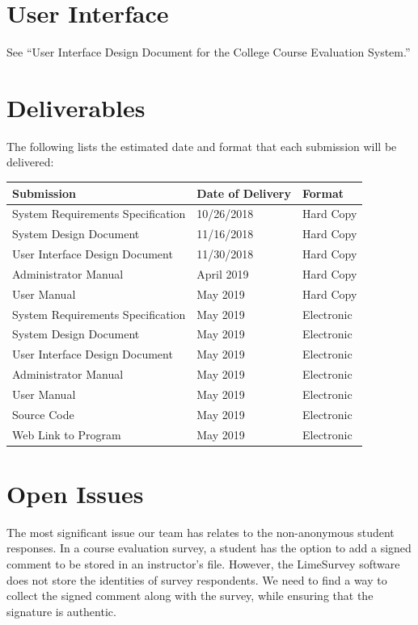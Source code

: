 \documentclass{article}
\begin{document}
\newpage
\section{User Interface}

See ``User Interface Design Document for the College Course Evaluation System.''

\section{Deliverables}

The following lists the estimated date and format that each submission will be delivered:

\begin{center}
\begin{tabular}{|p{6cm}|p{3cm}|p{3cm}|} 
\hline
\textbf{Submission} & \textbf{Date of Delivery} & \textbf{Format} \\
\hline
System Requirements Specification & 10/26/2018 & Hard Copy\\ 
\hline
System Design Document & 11/16/2018 & Hard Copy\\ 
\hline
User Interface Design Document & 11/30/2018 & Hard Copy\\ 
\hline
Administrator Manual & April 2019 & Hard Copy\\ 
\hline
User Manual & May 2019 & Hard Copy\\ 
\hline
System Requirements Specification & May 2019 & Electronic\\ 
\hline
System Design Document & May 2019 & Electronic\\ 
\hline
User Interface Design Document & May 2019 & Electronic\\ 
\hline
Administrator Manual & May 2019 & Electronic\\ 
\hline
User Manual & May 2019 & Electronic\\ 
\hline
Source Code & May 2019 & Electronic\\ 
\hline
Web Link to Program & May 2019 & Electronic\\ 
\hline
\end{tabular}
\end{center}

\section{Open Issues}

The most significant issue our team has relates to the non-anonymous student responses. In a course evaluation survey, a student has the option to add a signed comment to be stored in an instructor's file. However, the LimeSurvey software does not store the identities of survey respondents. We need to find a way to collect the signed comment along with the survey, while ensuring that the signature is authentic.
\end{document}
